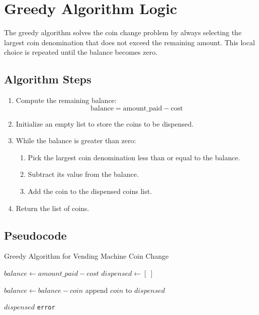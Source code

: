 \documentclass[12pt,a4paper]{report}
\begin{document}
\section{Greedy Algorithm Logic}
The greedy algorithm solves the coin change problem by always selecting the largest coin denomination that does not exceed the remaining amount. This local choice is repeated until the balance becomes zero.

\subsection{Algorithm Steps}
\begin{enumerate}
    \item Compute the remaining balance:
    \[
        \text{balance} = \text{amount\_paid} - \text{cost}
    \]
    \item Initialize an empty list to store the coins to be dispensed.
    \item While the balance is greater than zero:
    \begin{enumerate}
        \item Pick the largest coin denomination less than or equal to the balance.
        \item Subtract its value from the balance.
        \item Add the coin to the dispensed coins list.
    \end{enumerate}
    \item Return the list of coins.
\end{enumerate}


\subsection{Pseudocode}
\begin{algorithm}
\caption{Greedy Algorithm for Vending Machine Coin Change}
\begin{algorithmic}[1]
    \State {}
    \State $balance \gets amount\_paid - cost$
    \State $dispensed \gets [\ ]$ 
    
            \State $balance \gets balance - coin$ 
            \State append $coin$ to $dispensed$
        \EndWhile
    \EndFor
    
        \State \Return $dispensed$ 
    \Else
        \State \Return \texttt{error} 
    \EndIf
\EndProcedure
\end{algorithmic}
\end{algorithm}
\end{document}
